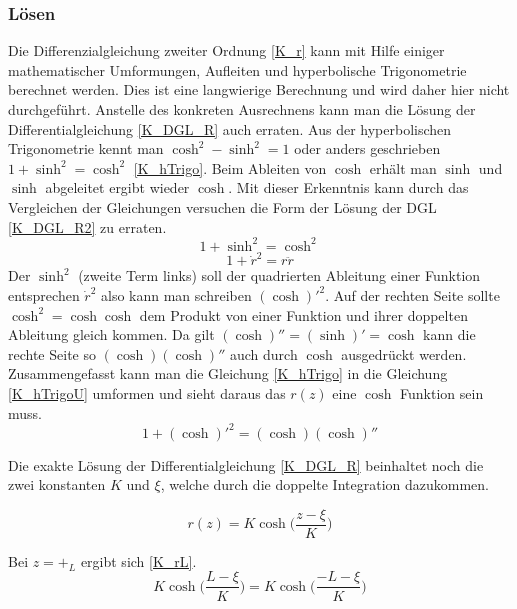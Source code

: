 \begin{refsection}
\subsubsection{Lösen}
Die Differenzialgleichung zweiter Ordnung \eqref{K_r} kann mit Hilfe einiger mathematischer Umformungen, Aufleiten und hyperbolische Trigonometrie berechnet werden. 
Dies ist eine langwierige Berechnung und wird daher hier nicht durchgeführt.
Anstelle des konkreten Ausrechnens kann man die Lösung der Differentialgleichung \eqref{K_DGL_R} auch erraten. 
Aus der hyperbolischen Trigonometrie kennt man $\cosh^2-\sinh^2=1$ oder anders geschrieben $1+\sinh^2=\cosh^2$ \eqref{K_hTrigo}. Beim Ableiten von $\cosh$ erhält man $\sinh$ und $\sinh$ abgeleitet ergibt wieder $\cosh$. Mit dieser Erkenntnis kann durch das Vergleichen der Gleichungen versuchen die Form der Lösung der DGL \eqref{K_DGL_R2} zu erraten. 
\begin{equation} \label{K_hTrigo}
1+\sinh^2=\cosh^2
\end{equation}
\begin{equation} \label{K_DGL_R2}
1+{\dot {r}}^2=r  \ddot{r}
\end{equation}
Der $\sinh^2$  (zweite Term links) soll der quadrierten Ableitung einer Funktion entsprechen ${\dot {r}}^2$ also kann man schreiben $(\cosh)'^2$. Auf der rechten Seite sollte $\cosh^2=\cosh \cosh$ dem Produkt von einer Funktion und ihrer doppelten Ableitung gleich kommen. Da gilt $(\cosh)''=(\sinh)'=\cosh$ kann die rechte Seite so $(\cosh) (\cosh)''$ auch durch $\cosh$ ausgedrückt werden. Zusammengefasst kann man die Gleichung \eqref{K_hTrigo} in die Gleichung \eqref{K_hTrigoU} umformen und sieht daraus das $r(z)$ eine $\cosh$ Funktion sein muss.
\begin{equation} \label{K_hTrigoU}
1+(\cosh)'^2=(\cosh) (\cosh)''
\end{equation}

Die exakte Lösung der Differentialgleichung \eqref{K_DGL_R} beinhaltet noch die zwei konstanten $K$ und $\xi$, welche durch die doppelte Integration dazukommen.

\begin{equation} \label{K_r}
r(z)=K \cosh\bigg(\frac{z-\xi}{K}\bigg)
\end{equation}

Bei $z=+_L$ ergibt sich \eqref{K_rL}.
\begin{equation} \label{K_rL}
K \cosh\bigg(\frac{L-\xi}{K}\bigg)=K \cosh\bigg(\frac{-L-\xi}{K}\bigg)
\end{equation}


\end{refsection}
